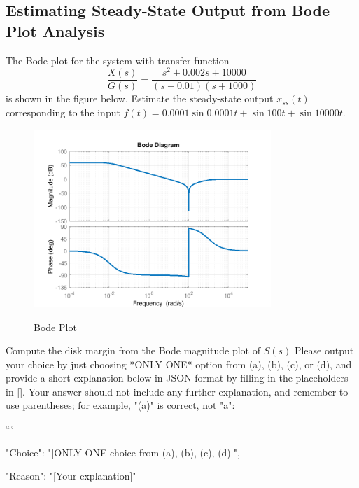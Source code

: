 \documentclass[12pt]{article}
\begin{document}
\subsection{Estimating Steady-State Output from Bode Plot Analysis}

The Bode plot for the system with transfer function
\begin{equation}
    \frac{X(s)}{G(s)} = \frac{s^2+0.002s+10000}{(s+0.01)(s+1000)}
\end{equation}
is shown in the figure below. Estimate the steady-state output \(x_{ss}(t)\) corresponding to the input \(f(t) = 0.0001\sin 0.0001t + \sin 100t + \sin 10000t\).
\begin{figure}[H]
    \centering
    \includegraphics[width=0.8\textwidth]{figs/6.10.png}
    \label{fig:99}
    \caption{Bode Plot}
\end{figure}

Compute the disk margin from the Bode magnitude plot of $S(s)$ 
Please output your choice by just choosing *ONLY ONE* option from (a), (b), (c), or (d), and provide a short explanation below in JSON format by filling in the placeholders in []. Your answer should not include any further explanation, and remember to use parentheses; for example, "(a)" is correct, not "a":

```
{

"Choice": "[ONLY ONE choice from (a), (b), (c), (d)]",

"Reason": "[Your explanation]"

}
\end{document}
